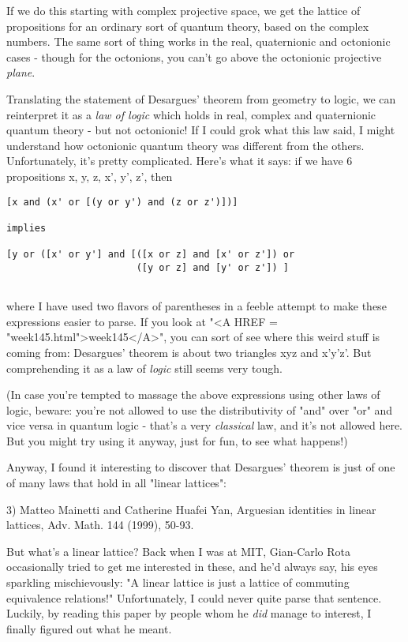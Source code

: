 If we do this starting with complex projective space, we get the lattice
of propositions for an ordinary sort of quantum theory, based on the
complex numbers.  The same sort of thing works in the real, quaternionic
and octonionic cases - though for the octonions, you can't go above the
octonionic projective \emph{plane}.

Translating the statement of Desargues' theorem from geometry to logic,
we can reinterpret it as a \emph{law of logic} which holds in real, complex
and quaternionic quantum theory - but not octonionic!  If I could grok
what this law said, I might understand how octonionic quantum theory was
different from the others.   Unfortunately, it's pretty complicated.
Here's what it says: if we have 6 propositions x, y, z, x', y', z', then

\begin{verbatim}
[x and (x' or [(y or y') and (z or z')])] 

implies

[y or ([x' or y'] and [([x or z] and [x' or z']) or
                       ([y or z] and [y' or z']) ]
                       
\end{verbatim}
    

where I have used two flavors of parentheses in a feeble attempt to make
these expressions easier to parse.  If you look at "<A HREF =
"week145.html">week145</A>", you can sort of see where this weird
stuff is coming from: Desargues' theorem is about two triangles xyz and
x'y'z'.  But comprehending it as a law of \emph{logic} still seems very
tough.


(In case you're tempted to massage the above expressions using other
laws of logic, beware: you're not allowed to use the distributivity of
"and" over "or" and vice versa in quantum logic -
that's a very \emph{classical} law, and it's not allowed here.  But
you might try using it anyway, just for fun, to see what happens!)

Anyway, I found it interesting to discover that Desargues' theorem is
just of one of many laws that hold in all "linear lattices":
 
3) Matteo Mainetti and Catherine Huafei Yan, Arguesian identities in
linear lattices, Adv. Math. 144 (1999), 50-93.

But what's a linear lattice?   Back when I was at MIT, Gian-Carlo Rota
occasionally tried to get me interested in these, and he'd always say,
his eyes sparkling mischievously: "A linear lattice is just a lattice of
commuting equivalence relations!"  Unfortunately, I could never quite
parse that sentence.  Luckily, by reading this paper by people whom he
\emph{did} manage to interest, I finally figured out what he meant.


